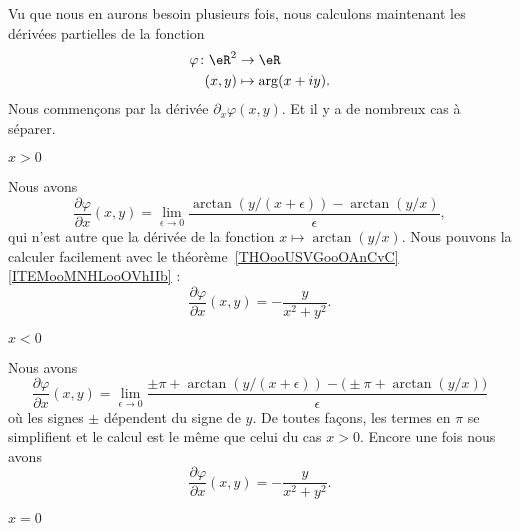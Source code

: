 \begin{normaltext}     \label{NORMooMRBEooVtTcIA}
    Vu que nous en aurons besoin plusieurs fois, nous calculons maintenant les dérivées partielles de la fonction
    \begin{equation}
        \begin{aligned}
            \varphi\colon \eR^2&\to \eR \\
            (x,y)&\mapsto \arg(x+iy).
        \end{aligned}
    \end{equation}
    Nous commençons par la dérivée \( \partial_x\varphi(x,y)\). Et il y a de nombreux cas à séparer.
    \begin{subproof}

         \item[\( x>0\)]

             Nous avons
             \begin{equation}
                 \frac{ \partial \varphi }{ \partial x }(x,y)=\lim_{\epsilon\to 0}\frac{ \arctan(y/(x+\epsilon))-\arctan(y/x) }{ \epsilon },
             \end{equation}
             qui n'est autre que la dérivée de la fonction \( x\mapsto\arctan(y/x)\). Nous pouvons la calculer facilement avec le théorème~\ref{THOooUSVGooOAnCvC}\ref{ITEMooMNHLooOVhIIb} :
             \begin{equation}
                 \frac{ \partial \varphi }{ \partial x }(x,y)=-\frac{ y }{ x^2+y^2 }.
             \end{equation}

         \item[\( x<0\)]

             Nous avons
             \begin{equation}
                 \frac{ \partial \varphi }{ \partial x }(x,y)=\lim_{\epsilon\to 0}\frac{ \pm\pi+\arctan(y/(x+\epsilon))-\big( \pm\pi+\arctan(y/x) \big) }{ \epsilon }
             \end{equation}
             où les signes \( \pm\) dépendent du signe de \( y\). De toutes façons, les termes en \( \pi\) se simplifient et le calcul est le même que celui du cas \( x>0\). Encore une fois nous avons
             \begin{equation}
                 \frac{ \partial \varphi }{ \partial x }(x,y)=-\frac{ y }{ x^2+y^2 }.
             \end{equation}

         \item[\( x=0\)]


\end{subproof}
\end{normaltext}
